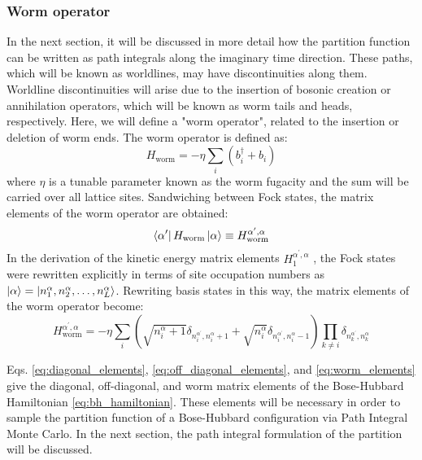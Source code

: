 \documentclass[12pt, two sided]{article}
\begin{document}
\subsubsection{Worm operator}

In the next section, it will be discussed in more detail how the partition function can be written as path integrals along the imaginary time direction. These paths, which will be known as worldlines, may have discontinuities along them. Worldline discontinuities will arise due to the insertion of bosonic creation or annihilation operators, which will be known as worm tails and heads, respectively. Here, we will define a "worm operator", related to the insertion or deletion of worm ends. The worm operator is defined as:
%
\begin{equation}
\label{eq:worm_operator}
H_\mathrm{worm} = -\eta \sum_i (b_i^\dag + b_i)
\end{equation}
%
where $\eta$ is a tunable parameter known as the worm fugacity and the sum will be carried over all lattice sites. Sandwiching between Fock states, the matrix elements of the worm operator are obtained:
%
\begin{equation}
\bra{\alpha^\prime} H_\mathrm{worm} \ket{\alpha} \equiv H_\mathrm{worm}^{\alpha^\prime,\alpha} 
\end{equation}
%
In the derivation of the kinetic energy matrix elements $H_1^{\alpha^\prime,\alpha}$ , the Fock states were rewritten explicitly in terms of site occupation numbers as $\ket{\alpha} = \ket{n_1^{\alpha},n_2^{\alpha},\dots,n_L^{\alpha}}$. Rewriting basis states in this way, the matrix elements of the worm operator become:
%
\begin{equation}
\label{eq:worm_elements}
H_\mathrm{worm}^{\alpha^\prime,\alpha} =  -\eta \sum_i  (\sqrt{n_i^{\alpha} + 1} \delta_{n_i^{\alpha^\prime},n_{i}^{\alpha}+1}  + \sqrt{n_i^{\alpha}} \delta_{n_i^{\alpha^\prime},n_{i}^{\alpha}-1}) \prod_{k\neq i} \delta_{n_k^{\alpha^\prime},n_k^{\alpha}} 
\end{equation}
%

Eqs. \eqref{eq:diagonal_elements}, \eqref{eq:off_diagonal_elements}, and \eqref{eq:worm_elements} give the diagonal, off-diagonal, and worm matrix elements of the Bose-Hubbard Hamiltonian \eqref{eq:bh_hamiltonian}. These elements will be necessary in order to sample the partition function of a Bose-Hubbard configuration via Path Integral Monte Carlo. In the next section, the path integral formulation of the partition will be discussed.
 
\end{document}

